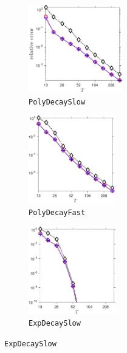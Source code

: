 \documentclass[final]{siamart1116}
\numberwithin{equation}{section}
\numberwithin{theorem}{section}
\numberwithin{figure}{section}
\begin{document}
\begin{figure}[htp!]
\begin{center}
\begin{subfigure}{.325\textwidth}
\begin{center}
\includegraphics[height=1.5in]{figures/PSLOW_Alg789.pdf}
\caption{\texttt{PolyDecaySlow}}
\label{fig:PSLOW-789}
\end{center}
\end{subfigure}
\begin{subfigure}{.325\textwidth}
\begin{center}
\includegraphics[height=1.5in]{figures/PFAST_Alg789.pdf}
\caption{\texttt{PolyDecayFast}}
\label{fig:PFAST-789}
\end{center}
\end{subfigure}
\begin{subfigure}{.325\textwidth}
\begin{center}
\includegraphics[height=1.5in]{figures/ESLOW_Alg789.pdf}
\caption{\texttt{ExpDecaySlow}}
\label{fig:ESLOW-789}
\end{center}
\end{subfigure}
\end{center}

\vspace{0.5em}


\end{figure}
\end{document}
